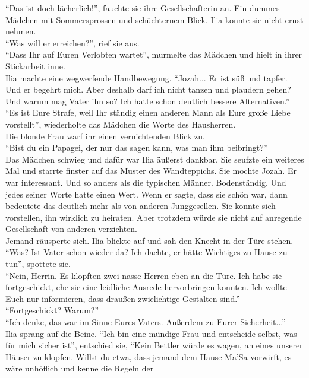 ``Das ist doch lächerlich!'', fauchte sie ihre Gesellschafterin an. Ein dummes Mädchen mit 
Sommersprossen und schüchternem Blick. Ilia konnte sie nicht ernst nehmen. \\
``Was will er erreichen?'', rief sie aus. \\
``Dass Ihr auf Euren Verlobten wartet'', murmelte das Mädchen und hielt in ihrer Stickarbeit inne.\\
Ilia machte eine wegwerfende Handbewegung. ``Jozah... Er ist süß und tapfer. Und er begehrt mich. 
Aber deshalb darf ich nicht tanzen und plaudern gehen? Und warum mag Vater ihn so? Ich hatte schon 
deutlich bessere Alternativen.'' \\
``Es ist Eure Strafe, weil Ihr ständig einen anderen Mann als Eure große Liebe vorstellt'', 
wiederholte das Mädchen die Worte des Hausherren. \\
Die blonde Frau warf ihr einen vernichtenden Blick zu. \\
``Bist du ein Papagei, der nur das sagen kann, was man ihm beibringt?'' \\
Das Mädchen schwieg und dafür war Ilia äußerst dankbar. Sie seufzte ein weiteres Mal und starrte 
finster auf das Muster des Wandteppichs. Sie mochte Jozah. Er war interessant. Und so anders als die 
typischen Männer. Bodenständig. Und jedes seiner Worte hatte einen Wert. Wenn er sagte, dass sie 
schön war, dann bedeutete das deutlich mehr als von anderen Junggesellen. Sie konnte sich 
vorstellen, ihn wirklich zu heiraten. Aber trotzdem würde sie nicht auf anregende Gesellschaft von 
anderen verzichten. \\
Jemand räusperte sich. Ilia blickte auf und sah den Knecht in der Türe stehen.\\
``Was? Ist Vater schon wieder da? Ich dachte, er hätte Wichtiges zu Hause zu tun'', spottete sie. \\
``Nein, Herrin. Es klopften zwei nasse Herren eben an die Türe. Ich habe sie fortgeschickt, ehe sie 
eine leidliche Ausrede hervorbringen konnten. Ich wollte Euch nur informieren, dass draußen 
zwielichtige Gestalten sind.''\\
``Fortgeschickt? Warum?'' \\
``Ich denke, das war im Sinne Eures Vaters. Außerdem zu Eurer Sicherheit...'' \\
Ilia sprang auf die Beine. ``Ich bin eine mündige Frau und entscheide selbst, was für mich sicher 
ist'', entschied sie, ``Kein Bettler würde es wagen, an eines unserer Häuser zu klopfen. Willst du 
etwa, dass jemand dem Hause Ma'Sa vorwirft, es wäre unhöflich und kenne die Regeln der 

